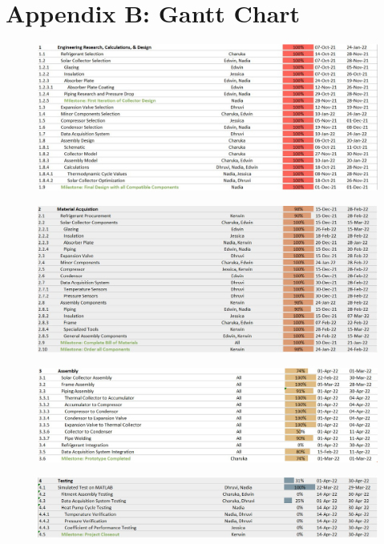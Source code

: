 \chapter{Appendix B: Gantt Chart}

\begin{figure}[H]
    \centering
    \includegraphics[width=15cm]{images/gantt1.png}
\end{figure}
\begin{figure}[H]
    \centering
    \includegraphics[width=15cm]{images/gantt2.png}
\end{figure}
\begin{figure}[H]
    \centering
    \includegraphics[width=15cm]{images/gantt3.png}
\end{figure}
\begin{figure}[H]
    \centering
    \includegraphics[width=15cm]{images/gantt4.png}
\end{figure}


